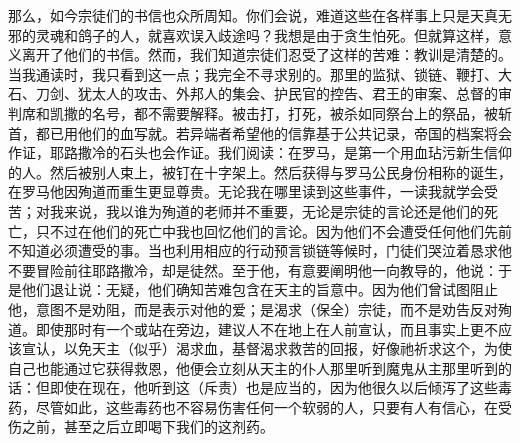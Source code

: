 那么，如今宗徒们的书信也众所周知。你们会说，难道这些在各样事上只是天真无邪的灵魂和鸽子的人，就喜欢误入歧途吗？我想是由于贪生怕死。但就算这样，意义离开了他们的书信。然而，我们知道宗徒们忍受了这样的苦难：教训是清楚的。当我通读时，我只看到这一点；我完全不寻求别的。那里的监狱、锁链、鞭打、大石、刀剑、犹太人的攻击、外邦人的集会、护民官的控告、君王的审案、总督的审判席和凯撒的名号，都不需要解释。被击打，打死，被杀如同祭台上的祭品，被斩首，都已用他们的血写就。若异端者希望他的信靠基于公共记录，帝国的档案将会作证，耶路撒冷的石头也会作证。我们阅读：在罗马，是第一个用血玷污新生信仰的人。然后被别人束上，被钉在十字架上。然后获得与罗马公民身份相称的诞生，在罗马他因殉道而重生更显尊贵。无论我在哪里读到这些事件，一读我就学会受苦；对我来说，我以谁为殉道的老师并不重要，无论是宗徒的言论还是他们的死亡，只不过在他们的死亡中我也回忆他们的言论。因为他们不会遭受任何他们先前不知道必须遭受的事。当也利用相应的行动预言锁链等候时，门徒们哭泣着恳求他不要冒险前往耶路撒冷，却是徒然。至于他，有意要阐明他一向教导的，他说：于是他们退让说：无疑，他们确知苦难包含在天主的旨意中。因为他们曾试图阻止他，意图不是劝阻，而是表示对他的爱；是渴求（保全）宗徒，而不是劝告反对殉道。即使那时有一个或站在旁边，建议人不在地上在人前宣认，而且事实上更不应该宣认，以免天主（似乎）渴求血，基督渴求救苦的回报，好像祂祈求这个，为使自己也能通过它获得救恩，他便会立刻从天主的仆人那里听到魔鬼从主那里听到的话：但即使在现在，他听到这（斥责）也是应当的，因为他很久以后倾泻了这些毒药，尽管如此，这些毒药也不容易伤害任何一个软弱的人，只要有人有信心，在受伤之前，甚至之后立即喝下我们的这剂药。\par

